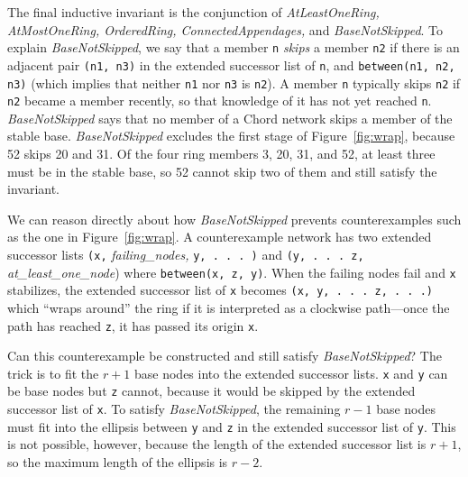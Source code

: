 \documentclass[conference]{IEEEtran}
\begin{document}
The final inductive invariant is the conjunction of 
{\it AtLeastOneRing, AtMostOneRing, OrderedRing, ConnectedAppendages,}
and {\it BaseNotSkipped}.
To explain {\it BaseNotSkipped},
we say that a member
\small
{\tt n}
\normalsize
{\it skips} a member
\small
{\tt n2}
\normalsize
if there is an adjacent pair 
\small
{\tt (n1, n3)}
\normalsize
in the extended successor list of
\small
{\tt n},
\normalsize
and
\small
{\tt between(n1, n2, n3)}
\normalsize
(which implies that neither
\small
{\tt n1}
\normalsize
nor
\small
{\tt n3}
\normalsize
is
\small
{\tt n2}).
\normalsize
A member
\small
{\tt n}
\normalsize
typically skips
\small
{\tt n2}
\normalsize
if
\small
{\tt n2}
\normalsize
became a
member recently, so that knowledge of it has not yet reached 
\small
{\tt n}.
\normalsize
{\it BaseNotSkipped} says that no member
of a Chord network skips a member of the stable base.
{\it BaseNotSkipped} excludes the first stage of Figure~\ref{fig:wrap},
because 52 skips 20 and 31.
Of the four ring members 3, 20, 31, and 52, at least three must be in
the stable base, so 52 cannot skip two of them and still satisfy
the invariant.

We can reason directly about how {\it BaseNotSkipped} prevents
counterexamples such as the one in Figure~\ref{fig:wrap}.
A counterexample network has two extended successor lists
\small
{\tt (x,} 
\normalsize
{\it failing\_nodes,}
\small
{\tt y, . . . )}
\normalsize
and 
\small
{\tt (y, . . . z,}
\normalsize
{\it at\_least\_one\_node})
where 
\small
{\tt between(x, z, y)}.
\normalsize
When the failing nodes fail and 
\small
{\tt x}
\normalsize
stabilizes, the extended successor list of 
\small
{\tt x}
\normalsize
becomes 
\small
{\tt (x, y, . . . z, . . .)}
\normalsize
which ``wraps around'' the ring if it is interpreted as a clockwise
path---once the path has reached 
\small
{\tt z},
\normalsize
it has passed its origin 
\small
{\tt x}.
\normalsize

Can this counterexample be constructed and still satisfy 
{\it BaseNotSkipped}?
The trick is to fit the $r + 1$ base nodes into the extended successor
lists.
\small
{\tt x}
\normalsize
and
\small
{\tt y}
\normalsize
can be base nodes but
\small
{\tt z}
\normalsize
cannot, because it would be skipped by the extended successor list of
\small
{\tt x}.
\normalsize
To satisfy {\it BaseNotSkipped}, the remaining $r - 1$ base nodes
must fit into the ellipsis between 
\small
{\tt y} 
\normalsize
and
\small
{\tt z}
\normalsize
in the extended successor list of
\small
{\tt y}.
\normalsize
This is not possible, however, because the length of the extended
successor list is $r + 1$, so the maximum length of the ellipsis is
$r - 2$.
\end{document}
